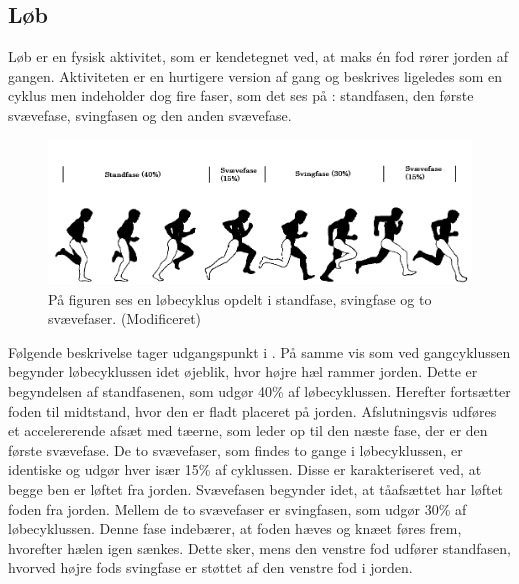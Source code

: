 \subsection{Løb}
Løb er en fysisk aktivitet, som er kendetegnet ved, at maks én fod rører jorden af gangen. Aktiviteten er en hurtigere version af gang og beskrives ligeledes som en cyklus men indeholder dog fire faser, som det ses på : standfasen, den første svævefase, svingfasen og den anden svævefase. \citep{Adelaar1986,Novacheck1998}
\begin{figure}[H]
	\centering
	\includegraphics[scale=0.4]{figures/bProblemloesning/loeb_cyklus1.png}
	\caption{På figuren ses en løbecyklus opdelt i standfase, svingfase og to svævefaser. \citep{Adelaar1986} (Modificeret)}
	\label{fig:loebecyklus}
\end{figure}
Følgende beskrivelse tager udgangspunkt i . På samme vis som ved gangcyklussen begynder løbecyklussen idet øjeblik, hvor højre hæl rammer jorden. Dette er begyndelsen af standfasenen, som udgør 40\% af løbecyklussen. Herefter fortsætter foden til midtstand, hvor den er fladt placeret på jorden. Afslutningsvis udføres et accelererende afsæt med tæerne, som leder op til den næste fase, der er den første svævefase. \citep{Adelaar1986,Novacheck1998} \newline 
De to svævefaser, som findes to gange i løbecyklussen, er identiske og udgør hver især 15\% af cyklussen. Disse er karakteriseret ved, at begge ben er løftet fra jorden. \citep{Adelaar1986,Novacheck1998} Svævefasen begynder idet, at tåafsættet har løftet foden fra jorden. Mellem de to svævefaser er svingfasen, som udgør 30\% af løbecyklussen. Denne fase indebærer, at foden hæves og knæet føres frem, hvorefter hælen igen sænkes. Dette sker, mens den venstre fod udfører standfasen, hvorved højre fods svingfase er støttet af den venstre fod i jorden. \citep{Adelaar1986,Novacheck1998} %

